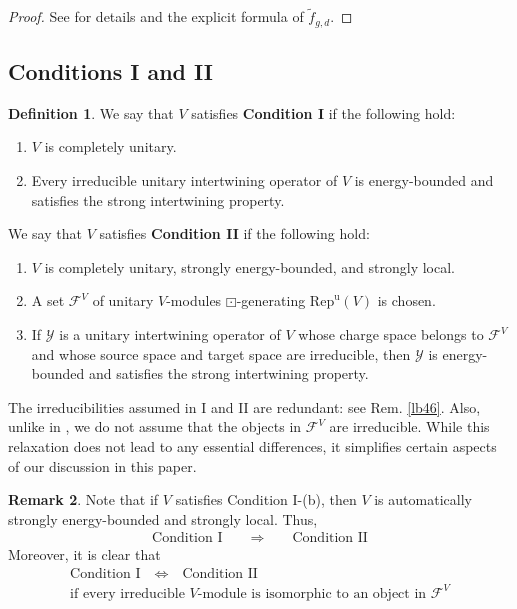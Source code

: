 \documentclass[11pt,b5paper,notitlepage]{article}
\theoremstyle{definition}
\newtheorem{df}{Definition}[section]
\newtheorem{rem}[df]{Remark}
\theoremstyle{plain}
\newcommand{\mc}{\mathcal}
\newcommand{\wtd}{\widetilde}
\newcommand{\uni}{\mathrm{u}}
\newcommand{\RepV}{{\mathrm{Rep}^\uni(V)}}
\numberwithin{equation}{section}
\begin{document}
\begin{proof}
See \cite[Prop. 2.2.2]{Gui20} for details and the explicit formula of $\wtd f_{g,d}$.
\end{proof}





\subsection{Conditions I and II}



\begin{df}\label{lb34}
We say that $V$ satisfies \textbf{Condition I} if the following hold:
\begin{enumerate}[label=(\alph*)]
\item $V$ is completely unitary.
\item Every irreducible unitary intertwining operator of $V$ is energy-bounded and satisfies the strong intertwining property. 
\end{enumerate}
We say that $V$ satisfies \textbf{Condition II} if the following hold: 
\begin{enumerate}[label=(\arabic*)]
\item $V$ is completely unitary, strongly energy-bounded, and strongly local.
\item A set $\mc F^V$ of unitary $V$-modules $\boxdot$-generating $\RepV$ is chosen. 
\item If $\mc Y$ is a unitary intertwining operator of $V$ whose charge space belongs to $\mc F^V$ and whose source space and target space are irreducible, then $\mc Y$ is energy-bounded and satisfies the strong intertwining property. 
\end{enumerate}
\end{df}

The irreducibilities  assumed in I and II are redundant: see Rem. \ref{lb46}. Also, unlike in \cite{Gui20}, we do not assume that the objects in $\mc F^V$ are irreducible.  While this relaxation does not lead to any essential differences, it simplifies certain aspects of our discussion in this paper.



\begin{rem}\label{lb36}
Note that if $V$ satisfies Condition I-(b), then $V$ is automatically strongly energy-bounded and strongly local. Thus, 
\begin{align*}
\text{Condition I}\qquad\Longrightarrow\qquad\text{Condition II}
\end{align*}
Moreover, it is clear that
\begin{gather*}
\text{Condition I}\quad\Longleftrightarrow\quad\text{Condition II}\\
\text{if every irreducible $V$-module is isomorphic to an object in $\mc F^V$}
\end{gather*}
\end{rem}
\end{document}
